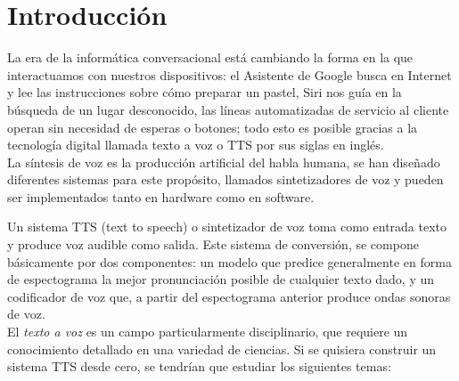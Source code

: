 \chapter*{Introducción}\label{chapter:introduction}

La era de la informática conversacional está cambiando la forma en la que interactuamos con nuestros dispositivos: el Asistente de Google busca en Internet y lee las instrucciones sobre cómo preparar un pastel, Siri nos guía en la búsqueda de un lugar desconocido, las líneas automatizadas de servicio al cliente operan sin necesidad de esperas o botones; todo esto es posible gracias a la tecnología digital llamada texto a voz o TTS por sus siglas en inglés. \\


La síntesis de voz es la producción artificial del habla humana, se han diseñado diferentes
sistemas para este propósito, llamados sintetizadores de voz y pueden ser implementados tanto
en hardware como en software. 

Un sistema TTS (text to speech) o sintetizador de voz toma como entrada texto y produce voz audible como salida. Este sistema de conversión, se compone básicamente por dos componentes: un modelo que predice generalmente en forma de espectograma la mejor pronunciación posible de cualquier texto dado, y un codificador de voz que, a partir del espectograma anterior produce ondas sonoras de voz.\\

El \textit{texto a voz} es un campo particularmente disciplinario, que requiere un conocimiento
detallado en una variedad de ciencias. Si se quisiera construir un sistema TTS desde cero, se tendrían que estudiar los siguientes temas:

